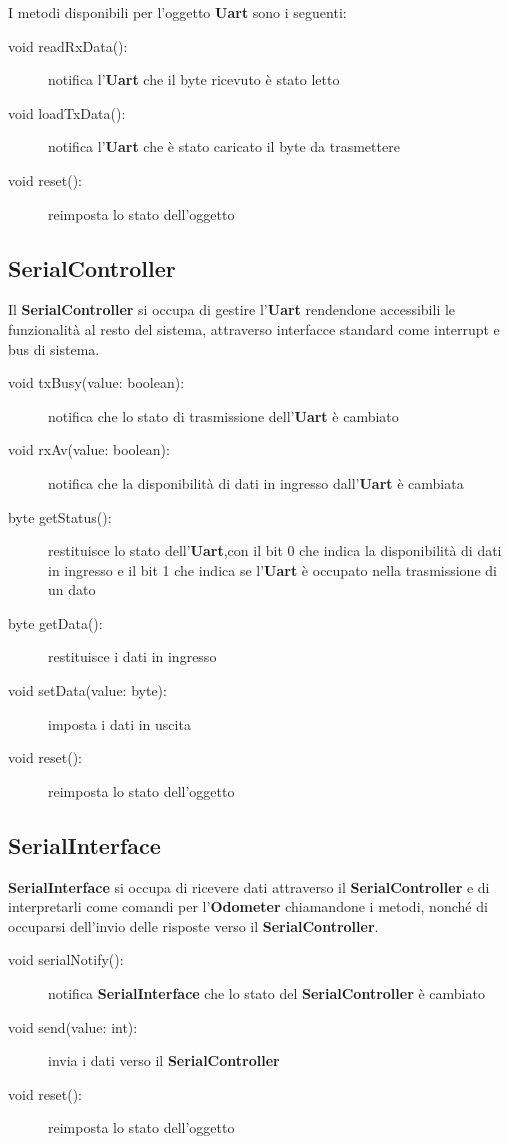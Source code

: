 \documentclass [11pt,a4paper,oneside]{article}
\begin{document}
I metodi disponibili per l'oggetto \textbf{Uart} sono i seguenti:

\begin{description}
\item[void readRxData():] notifica l'\textbf{Uart} che il byte ricevuto è
    stato letto
\item[void loadTxData():] notifica l'\textbf{Uart} che è stato caricato il
    byte da trasmettere
\item[void reset():] reimposta lo stato dell'oggetto
\end{description}

\subsection{SerialController}
Il \textbf{SerialController} si occupa di gestire l'\textbf{Uart}
rendendone accessibili le funzionalità al resto del sistema,
attraverso interfacce standard come interrupt e bus di sistema.

\begin{description}
\item[void txBusy(value: boolean):] notifica che lo stato di trasmissione
    dell'\textbf{Uart} è cambiato
\item[void rxAv(value: boolean):] notifica che la disponibilità di dati
    in ingresso dall'\textbf{Uart} è cambiata
\item[byte getStatus():] restituisce lo stato dell'\textbf{Uart},con il
    bit 0 che indica la disponibilità di dati in ingresso e il bit 1 che
    indica se l'\textbf{Uart} è occupato nella trasmissione di un dato
\item[byte getData():] restituisce i dati in ingresso
\item[void setData(value: byte):] imposta i dati in uscita
\item[void reset():] reimposta lo stato dell'oggetto
\end{description}

\subsection{SerialInterface}
\textbf{SerialInterface} si occupa di ricevere dati attraverso il
\textbf{SerialController} e di interpretarli come comandi per
l'\textbf{Odometer} chiamandone i metodi, nonché di occuparsi
dell'invio delle risposte verso il \textbf{SerialController}.

\begin{description}
\item[void serialNotify():] notifica \textbf{SerialInterface} che
    lo stato del \textbf{SerialController} è cambiato
\item[void send(value: int):] invia i dati verso il
    \textbf{SerialController}
\item[void reset():] reimposta lo stato dell'oggetto
\end{description}
\end{document}
